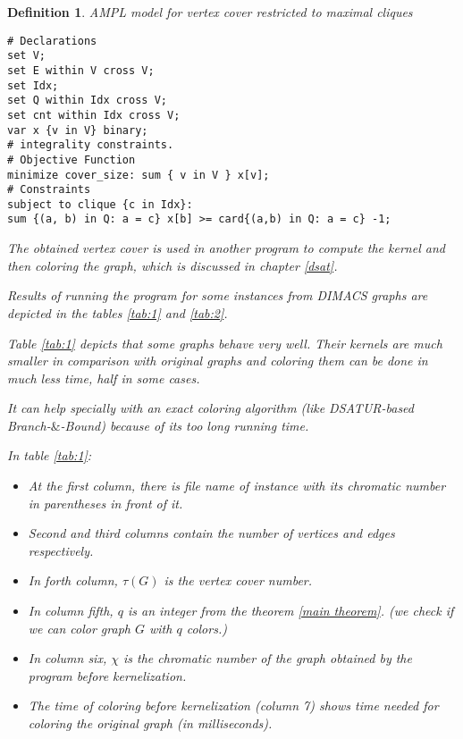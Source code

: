 \documentclass[12pt]{article}
\theoremstyle{slplain}
\newtheorem{defi}{Definition}[section]
\begin{document}
\begin{defi}
\newpage
AMPL model for vertex cover restricted to maximal cliques

\hline

\begin{verbatim}
# Declarations
set V;
set E within V cross V;
set Idx;
set Q within Idx cross V;
set cnt within Idx cross V;
var x {v in V} binary;
# integrality constraints.
# Objective Function
minimize cover_size: sum { v in V } x[v];
# Constraints
subject to clique {c in Idx}:
sum {(a, b) in Q: a = c} x[b] >= card{(a,b) in Q: a = c} -1;
\end{verbatim}

\newpage
The obtained vertex cover is used in another program to compute the
kernel and then coloring the graph, which is discussed in chapter \ref{dsat}.

Results of running the program for some instances from DIMACS graphs \cite{instance} are depicted in the tables \ref{tab:1} and \ref{tab:2}.

Table \ref{tab:1} depicts that some graphs behave very well. Their kernels are much smaller in comparison with original graphs and coloring them can be done in much less time, half in some cases. 

It can help specially with an exact coloring algorithm (like DSATUR-based Branch-$\&$-Bound) because of its too long running time.



In table \ref{tab:1}:

\begin{itemize}
\item At the first column, there is file name of instance with its chromatic number in parentheses in front of it.

\item Second and third columns contain the number of vertices and edges respectively. 

\item In forth column, $\tau(G)$ is the vertex cover number.

\item In column fifth, $q$ is an integer from the theorem \ref{main theorem}. (we check if we can color graph $G$ with $q$ colors.) 
\item In column six, $\chi$ is the chromatic number of the graph obtained by the program before kernelization.

\item The time of coloring before kernelization (column 7) shows time needed for coloring the original graph (in milliseconds).


\end{itemize}
\end{defi}
\end{document}
